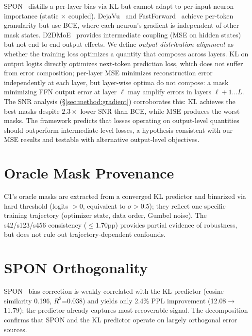 SPON~\cite{xu2025spon} distills a per-layer bias via KL but cannot adapt to per-input neuron importance (static $\times$ coupled).
DejaVu~\cite{liu2023dejavu} and FastForward~\cite{gautam2026fastforward} achieve per-token granularity but use BCE, where each neuron's gradient is independent of other mask states.
D2DMoE~\cite{szatkowski2024d2dmoe} provides intermediate coupling (MSE on hidden states) but not end-to-end output effects.
We define \emph{output-distribution alignment} as whether the training loss optimizes a quantity that composes across layers.
KL on output logits directly optimizes next-token prediction loss, which does not suffer from error composition; per-layer MSE minimizes reconstruction error independently at each layer, but layer-wise optima do not compose: a mask minimizing FFN output error at layer $\ell$ may amplify errors in layers $\ell{+}1 \ldots L$.
The SNR analysis (\S\ref{sec:method:gradient}) corroborates this: KL achieves the best masks despite $2.3\times$ lower SNR than BCE, while MSE produces the worst masks.
The framework predicts that losses operating on output-level quantities should outperform intermediate-level losses, a hypothesis consistent with our MSE results and testable with alternative output-level objectives.

\section{Oracle Mask Provenance}
\label{app:oracle_provenance}

C1's oracle masks are extracted from a converged KL predictor and binarized via hard threshold (logits $> 0$, equivalent to $\sigma > 0.5$); they reflect one specific training trajectory (optimizer state, data order, Gumbel noise).
The s42/s123/s456 consistency ($\leq$1.70pp) provides partial evidence of robustness, but does not rule out trajectory-dependent confounds.

\section{SPON Orthogonality}
\label{app:spon}

SPON~\cite{xu2025spon} bias correction is weakly correlated with the KL predictor (cosine similarity 0.196, $R^2$=0.038) and yields only 2.4\% PPL improvement (12.08$\to$11.79); the predictor already captures most recoverable signal.
The decomposition confirms that SPON and the KL predictor operate on largely orthogonal error sources.

